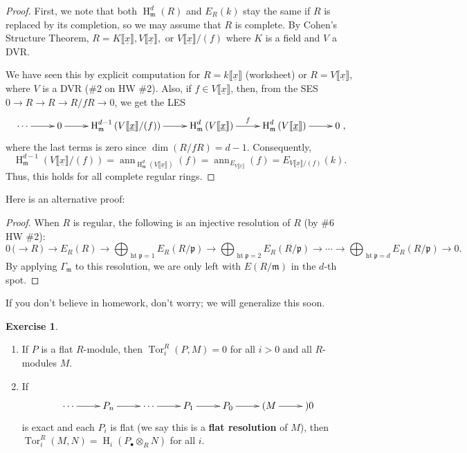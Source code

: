 \documentclass[11pt]{book}
\numberwithin{equation}{section}
\numberwithin{theorem}{chapter}
\theoremstyle{definition}
\newtheorem{exercise}[theorem]{Exercise}
\newtheorem*{basic properties}{Basic Properties}
\newtheorem*{Important Remark}{Important Remark}
\theoremstyle{remark}
\newcommand{\m}{\mathfrak{m}}
\newcommand{\Tor}{\operatorname{Tor}}
\newcommand{\height}{\operatorname{ht}}
\newcommand{\ann}{\operatorname{ann}}
\renewcommand{\dim}{\operatorname{dim}}
\renewcommand{\height}{\operatorname{ht}}
\renewcommand{\H}{\operatorname{H}}
\begin{document}
\begin{proof}
	First, we note that both $\H^d_\m(R)$ and $E_R(k)$ stay the same if $R$ is replaced by its completion, so we may assume that $R$ is complete. By Cohen's Structure Theorem, $R=K \llbracket \underline{x} \rrbracket, V \llbracket \underline{x} \rrbracket ,$ or $V \llbracket \underline{x} \rrbracket / (f)$ where $K$ is a field and $V$ a DVR.
	
	We have seen this by explicit computation for $R = k\llbracket\underline{x}\rrbracket$ (worksheet) or $R = V\llbracket\underline{x}\rrbracket$, where $V$ is a DVR (\#2 on HW \#2). Also, if $f \in V\llbracket\underline{x}\rrbracket$, then, from the SES $0\to R \to R \to R/fR \to 0$, we get the LES
	$$\xymatrix{\cdots \ar[r] & 0 \ar[r] & \H^{d-1}_\m \left( V\llbracket\underline{x}\rrbracket/(f) \right) \ar[r] & \H^{d}_\m \left( V\llbracket\underline{x}\rrbracket \right) \ar[r]^-f & \H^{d}_\m \left( V\llbracket\underline{x}\rrbracket \right) \ar[r] & 0},$$
	where the last terms is zero since $\dim(R/fR)=d-1$. Consequently,
	$$\H^{d-1}_\m \left( V\llbracket\underline{x}\rrbracket/(f) \right) = \ann_{\H^{d}_\m \left( V\llbracket\underline{x}\rrbracket \right)}(f) = \ann_{E_{V\llbracket\underline{x}\rrbracket}}(f) = E_{V\llbracket\underline{x}\rrbracket/(f)} (k).$$
	Thus, this holds for all complete regular rings.
\end{proof}

Here is an alternative proof:

\begin{proof}
	When $R$ is regular, the following is an injective resolution of $R$ (by \#6 HW \#2):
	\[0 \, \big(\to R \, \big) \, \to  E_R(R) \to \displaystyle\bigoplus_{\height \mathfrak{p} = 1} E_R(R/\mathfrak{p}) \to \displaystyle\bigoplus_{\height \mathfrak{p} = 2} E_R(R/\mathfrak{p}) \to \cdots \to \displaystyle\bigoplus_{\height \mathfrak{p} = d} E_R(R/\mathfrak{p}) \to 0.\]
	By applying $\Gamma_\m$ to this resolution, we are only left with $E(R/\m)$ in the $d$-th spot.
\end{proof}

If you don't believe in homework, don't worry; we will generalize this soon.


\begin{exercise}$\,$
	\begin{enumerate}[1)]
		\item If $P$ is a flat $R$-module, then $\Tor^R_i(P,M)=0$ for all $i>0$ and all $R$-modules $M$.
		\item If
		$$\xymatrix{\cdots \ar[r] & P_n \ar[r] & \cdots \ar[r] & P_1 \ar[r] & P_0 \ar[r] & (M \ar[r] & ) 0 }$$
		is exact and each $P_i$ is flat (we say this is a {\bf flat resolution} of $M$), then $\Tor^R_i(M,N)=\H_i(P_\bullet \otimes_R N)$ for all $i$.
	\end{enumerate}
\end{exercise}
\end{document}
